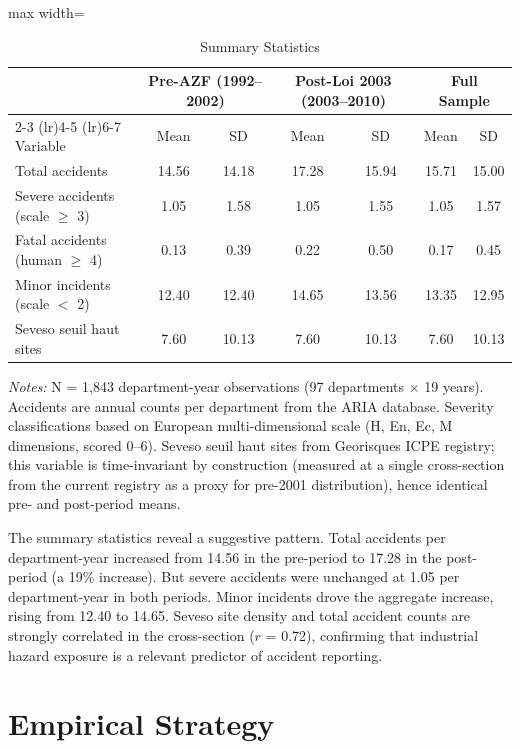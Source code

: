 \documentclass[12pt]{article}
\begin{document}
\begin{table}[H]
\centering
\caption{Summary Statistics}
\label{tab:summary}
\begin{adjustbox}{max width=\textwidth}
\begin{tabular}{lcccccc}
\toprule
 & \multicolumn{2}{c}{Pre-AZF (1992--2002)} & \multicolumn{2}{c}{Post-Loi 2003 (2003--2010)} & \multicolumn{2}{c}{Full Sample} \\
\cmidrule(lr){2-3} \cmidrule(lr){4-5} \cmidrule(lr){6-7}
Variable & Mean & SD & Mean & SD & Mean & SD \\
\midrule
Total accidents & 14.56 & 14.18 & 17.28 & 15.94 & 15.71 & 15.00 \\
Severe accidents (scale $\geq$ 3) & 1.05 & 1.58 & 1.05 & 1.55 & 1.05 & 1.57 \\
Fatal accidents (human $\geq$ 4) & 0.13 & 0.39 & 0.22 & 0.50 & 0.17 & 0.45 \\
Minor incidents (scale $<$ 2) & 12.40 & 12.40 & 14.65 & 13.56 & 13.35 & 12.95 \\
Seveso seuil haut sites & 7.60 & 10.13 & 7.60 & 10.13 & 7.60 & 10.13 \\
\bottomrule
\end{tabular}
\end{adjustbox}
\par\vspace{0.3em}
{\footnotesize \textit{Notes:} N = 1,843 department-year observations (97 departments $\times$ 19 years). Accidents are annual counts per department from the ARIA database. Severity classifications based on European multi-dimensional scale (H, En, Ec, M dimensions, scored 0--6). Seveso seuil haut sites from Georisques ICPE registry; this variable is time-invariant by construction (measured at a single cross-section from the current registry as a proxy for pre-2001 distribution), hence identical pre- and post-period means.}
\end{table}

The summary statistics reveal a suggestive pattern. Total accidents per department-year increased from 14.56 in the pre-period to 17.28 in the post-period (a 19\% increase). But severe accidents were unchanged at 1.05 per department-year in both periods. Minor incidents drove the aggregate increase, rising from 12.40 to 14.65. Seveso site density and total accident counts are strongly correlated in the cross-section ($r$ = 0.72), confirming that industrial hazard exposure is a relevant predictor of accident reporting.


\section{Empirical Strategy}
\label{sec:strategy}
\end{document}
